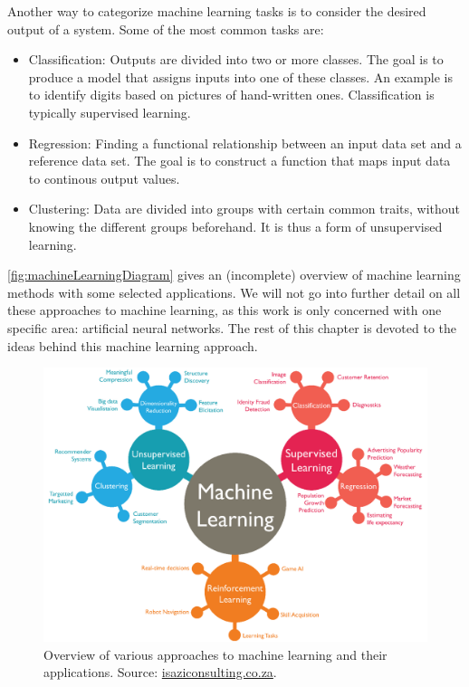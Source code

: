 \documentclass[twoside,english]{uiofysmaster}
\begin{document}
Another way to categorize machine learning tasks is to consider the desired output of a system.
Some of the most common tasks are:
\begin{itemize}
 \item Classification: Outputs are divided into two or more classes. The goal is to 
 produce a model that assigns inputs into one of these classes. An example is to identify
 digits based on pictures of hand-written ones. Classification is typically supervised learning.  
 \item Regression: Finding a functional relationship between an input data set and a reference data set. 
 The goal is to construct a function that maps input data to continous output values. 
 \item Clustering: Data are divided into groups with certain common traits, without knowing the different groups beforehand.
 It is thus a form of unsupervised learning.  
\end{itemize} 
\autoref{fig:machineLearningDiagram} gives an (incomplete) overview of machine learning methods with some selected applications.
We will not go into further detail on all these approaches to machine learning, as this work is only concerned with
one specific area: artificial neural networks. The rest of this chapter is devoted to the ideas behind this machine learning
approach. 
\begin{figure}
 \centering
 \includegraphics[width=\linewidth]{Figures/Theory/MachineLearningDiagram.png}
 \caption{Overview of various approaches to machine learning and their applications.
 Source: \href{http://www.isaziconsulting.co.za/machinelearning.html}{isaziconsulting.co.za}.}
 \label{fig:machineLearningDiagram}
\end{figure}
\end{document}
